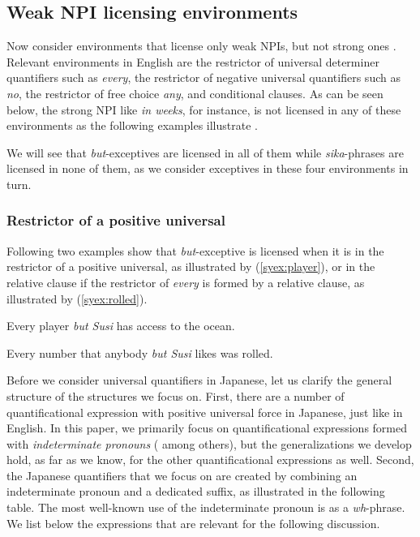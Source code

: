 \documentclass[output=paper]{langscibook}
\begin{document}
\subsection{Weak NPI licensing environments}

Now consider environments that license only weak NPIs, but not strong ones \citep{zwarts98a,gajewski11a}.
Relevant environments in English are the restrictor of universal determiner quantifiers such as \emph{every}, the restrictor of negative universal quantifiers such as \emph{no}, the restrictor of free choice \emph{any}, and conditional clauses.  
As can be seen below, the strong NPI like \emph{in weeks}, for instance, is not licensed in any of these environments as the following examples illustrate \citep{hoeksema05m}.

\ea {}
    \z
\z

We will see that \emph{but}-exceptives are licensed in all of them while \emph{sika}-phrases are licensed in none of them, as we consider exceptives in these four environments in turn.

\subsubsection{Restrictor of a positive universal} 
Following two examples show that \emph{but}-exceptive is licensed when it is in the restrictor of a positive universal, as illustrated by (\ref{syex:player}), or in the relative clause if the restrictor of \emph{every} is formed by a relative clause, as illustrated by (\ref{syex:rolled}).

\ea \label{syex:player} 
   Every player \emph{but Susi} has access to the ocean.

\ex \label{syex:rolled}
    Every number that anybody \emph{but Susi} likes was rolled.\z

Before we consider universal quantifiers in Japanese, let us clarify the general structure of the structures we focus on.
First, there are a number of quantificational expression with positive universal force in Japanese, just like in English.
In this paper, we primarily focus on quantificational expressions formed with \emph{indeterminate pronouns}  (\citealt{nishigauchi90, shimoyama06, yatsushiro09b} among others), but the generalizations we develop hold, as far as we know, for the other quantificational expressions as well.
Second, the Japanese quantifiers that we focus on are created by combining an indeterminate pronoun and a dedicated suffix, as  illustrated in the following table.
The most well-known use of the indeterminate pronoun is as a \emph{wh}-phrase. 
We list below the expressions that are relevant for the following discussion.
\end{document}
